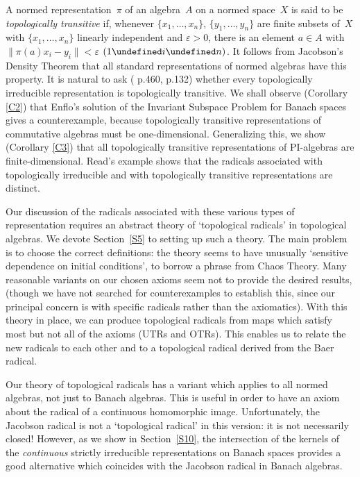 \documentclass[11pt]{article}
\let\leq\undefined  \let\geq\undefined
\let\le\leq   \let\ge\geq
\newcommand{\e}{\varepsilon}
\begin{document}
A normed representation~$\pi$ of an algebra~$A$ on a normed space~$X$ is said to
be {\em topologically transitive} if, whenever $\{x_1,\dots,x_n\}$,
$\{y_1,\dots,y_n\}$ are finite subsets of~$X$ with $\{x_1,\dots,x_n\}$ linearly
independent and $\e>0$, there is an element $a \in A$ with $\|\pi(a)x_i - y_i\|
< \e$ $(1 \le i \le n)$.  It follows from Jacobson's Density Theorem that all
standard representations of normed algebras have this property.    It is natural
to ask (\cite{Palmerbk} p.460, \cite{BD} p.132) whether every topologically
irreducible representation is topologically transitive.   We shall observe
(Corollary \ref{C2}) that Enflo's solution of the Invariant Subspace Problem for
Banach spaces gives a counterexample, because topologically transitive
representations of commutative algebras must be one-dimensional.  Generalizing
this, we show (Corollary \ref{C3}) that all topologically transitive
representations of PI-algebras are finite-dimensional.   Read's example shows
that the radicals associated with topologically irreducible and with
topologically transitive representations are distinct.

Our discussion of the radicals associated with these various types of
representation requires an abstract theory of `topological radicals'
in topological algebras.  We devote Section~\ref{S5} to setting up such a
theory.  The main problem is to choose the correct definitions: the theory seems
to have unusually `sensitive dependence on initial conditions', to borrow a
phrase from Chaos Theory.   Many reasonable variants on our chosen
axioms seem not to provide the desired results, (though we have not searched for
counterexamples to establish this, since our principal concern is with specific
radicals rather than the axiomatics).    With this theory in place, we can
produce topological radicals from maps which satisfy most but
not all of the axioms (UTRs and OTRs).   This enables us to relate the
new radicals to each other and to a topological radical derived from the Baer
radical.

Our theory of topological radicals has a variant which applies
to all normed algebras, not just to Banach algebras.  This is useful in order
to have an axiom about the radical of a continuous homomorphic image.
Unfortunately, the Jacobson radical is not a `topological radical' in this
version:  it is not necessarily closed!    However, as we show in
Section~\ref{S10}, the intersection of the kernels of the {\em continuous}
strictly irreducible representations on Banach spaces provides a good alternative
which coincides with the Jacobson radical in Banach algebras.
\end{document}
